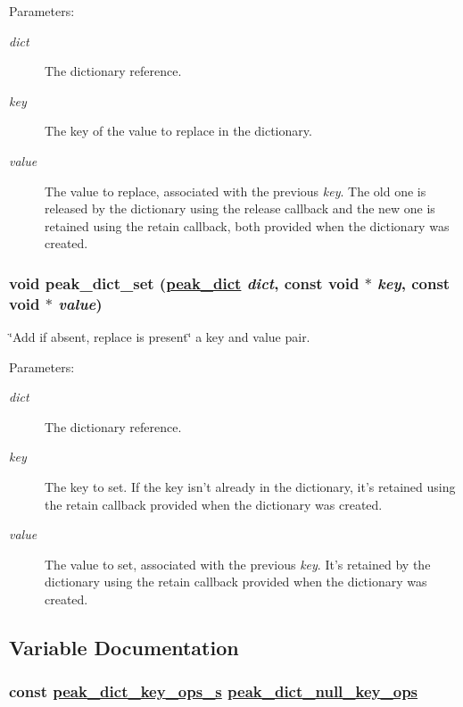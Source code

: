 \begin{Desc}
\item[Parameters:]
\begin{description}
\item[{\em dict}]The dictionary reference. \item[{\em key}]The key of the value to replace in the dictionary. \item[{\em value}]The value to replace, associated with the previous {\em key\/}. The old one is released by the dictionary using the release callback and the new one is retained using the retain callback, both provided when the dictionary was created. \end{description}
\end{Desc}
\hypertarget{group__dict_ga28}{
\subsubsection[peak\_\-dict\_\-set]{\setlength{\rightskip}{0pt plus 5cm}void peak\_\-dict\_\-set (\hyperlink{group__dict_ga0}{peak\_\-dict} {\em dict}, const void $\ast$ {\em key}, const void $\ast$ {\em value})}}
\label{group__dict_ga28}


\char`\"{}Add if absent, replace is present\char`\"{} a key and value pair. 

\begin{Desc}
\item[Parameters:]
\begin{description}
\item[{\em dict}]The dictionary reference. \item[{\em key}]The key to set. If the key isn't already in the dictionary, it's retained using the retain callback provided when the dictionary was created. \item[{\em value}]The value to set, associated with the previous {\em key\/}. It's retained by the dictionary using the retain callback provided when the dictionary was created. \end{description}
\end{Desc}


\subsection{Variable Documentation}
\hypertarget{group__dict_ga6}{
\subsubsection[peak\_\-dict\_\-null\_\-key\_\-ops]{\setlength{\rightskip}{0pt plus 5cm}const \hyperlink{structpeak__dict__key__ops__s}{peak\_\-dict\_\-key\_\-ops\_\-s} \hyperlink{group__dict_ga6}{peak\_\-dict\_\-null\_\-key\_\-ops}}}
\label{group__dict_ga6}


